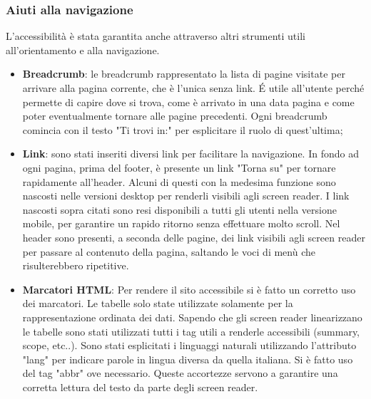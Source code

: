 \subsubsection{Aiuti alla navigazione}
 L'accessibilità è stata garantita anche attraverso altri strumenti utili all'orientamento e alla navigazione.
 \begin{itemize}
     \item \textbf{Breadcrumb}: le breadcrumb rappresentato la lista di pagine visitate per arrivare alla pagina corrente, che è l'unica senza link. É utile all'utente perché permette di capire dove si trova, come è arrivato in una data pagina e come poter eventualmente tornare alle pagine precedenti. Ogni breadcrumb comincia con il testo "Ti trovi in:" per esplicitare il ruolo di quest'ultima;
     \item \textbf{Link}: sono stati inseriti diversi link per facilitare la navigazione. In fondo ad ogni pagina, prima del footer, è presente un link "Torna su" per tornare rapidamente all'header. Alcuni di questi con la medesima funzione sono nascosti nelle versioni desktop per renderli visibili agli screen reader. 
     I link nascosti sopra citati sono resi disponibili a tutti gli utenti nella versione mobile, per garantire un rapido ritorno senza effettuare molto scroll.
     Nel header sono presenti, a seconda delle pagine, dei link visibili agli screen reader per passare al contenuto della pagina, saltando le voci di menù che risulterebbero ripetitive.
     \item \textbf{Marcatori HTML}: Per rendere il sito accessibile si è fatto un corretto uso dei marcatori.
     Le tabelle solo state utilizzate solamente per la rappresentazione ordinata dei dati. Sapendo che gli screen reader linearizzano le tabelle sono stati utilizzati tutti i tag utili a renderle accessibili (summary, scope, etc..). Sono stati esplicitati i linguaggi naturali utilizzando l'attributo "lang" per indicare parole in lingua diversa da quella italiana. Si è fatto uso del tag "abbr" ove necessario. Queste accortezze servono a garantire una corretta lettura del testo da parte degli screen reader.
 \end{itemize}
